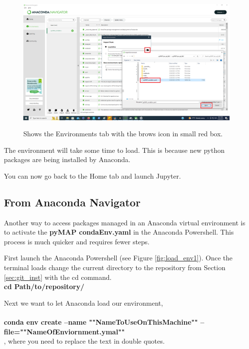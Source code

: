 \documentclass{article}
\begin{document}
 


 \begin{figure}[H]
\centering
\includegraphics[scale=0.4]{load_env3.png}
\label{fig:load_env3}
\caption{ Shows the Environments tab with the brows icon in small red box.}
\end{figure}


 The environment will take some time to load. This is because new python packages are being installed by Anaconda. 


 You can now go back to the Home tab and launch Jupyter.

 \subsection{From Anaconda Navigator}
 Another way to access packages managed in an Anaconda virtual environment is to activate the  \textbf{pyMAP condaEnv.yaml} in the Anaconda Powershell. This process is much quicker and requires fewer steps. 

 First launch the Anaconda Powershell (see Figure \ref{fig:load_env1}). Once the terminal loads change the current directory to the repository from Section \ref{sec:git_inst} with the cd command. \\

 \textbf{cd Path/to/repository/}

 Next we want to let Anaconda load our environment, \\ \\
\small{
 \textbf{ conda env create --name  ""NameToUseOnThisMachine"" --file=""NameOfEnviornment.ymal""}} \\

, where you need to replace the text in double quotes. \\ \\
\end{document}
